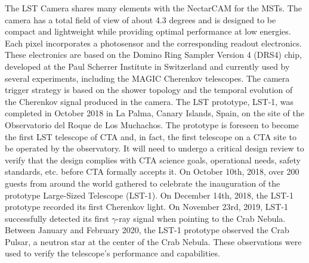The LST Camera shares many elements with the NectarCAM for the MSTs. The camera has a total field of view of about 4.3 degrees and is designed to be compact and lightweight while providing optimal performance at low energies. Each pixel incorporates a photosensor and the corresponding readout electronics. These electronics are based on the Domino Ring Sampler Version 4 (DRS4) chip, developed at the Paul Scherrer Institute in Switzerland and currently used by several experiments, including the MAGIC Cherenkov telescopes. The camera trigger strategy is based on the shower topology and the temporal evolution of the Cherenkov signal produced in the camera. The LST prototype, LST-1, was completed in October 2018 in La Palma, Canary Islands, Spain, on the site of the Observatorio del Roque de Los Muchachos. The prototype is foreseen to become the first LST telescope of CTA and, in fact, the first telescope on a CTA site to be operated by the observatory. It will need to undergo a critical design review to verify that the design complies with CTA science goals, operational needs, safety standards, etc. before CTA formally accepts it.
On October 10th, 2018, over 200 guests from around the world gathered to celebrate the inauguration of the prototype Large-Sized Telescope (LST-1). On December 14th, 2018, the LST-1 prototype recorded its first Cherenkov light. On November 23rd, 2019, LST-1 successfully detected its first $\gamma$-ray signal when pointing to the Crab Nebula. Between January and February 2020, the LST-1 prototype observed the Crab Pulsar, a neutron star at the center of the Crab Nebula. These observations were used to verify the telescope's performance and capabilities.

